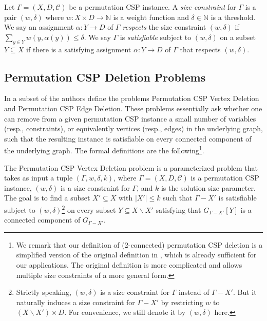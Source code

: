 \documentclass[a4paper,11pt]{article}
\numberwithin{lemma}{section}
\begin{document}
Let $\varGamma = (X,D,\mathcal{C})$ be a permutation CSP instance.
A \emph{size constraint} for $\varGamma$ is a pair $(w,\delta)$ where $w\colon X \times D \to \mathbb{N}$ is a weight function and $\delta \in \mathbb{N}$ is a threshold.
We say an assignment $\alpha\colon Y \to D$ of $\varGamma$ \emph{respects} the size constraint $(w,\delta)$ if $\sum_{y \in Y} w(y,\alpha(y)) \leq \delta$.
We say $\varGamma$ is \emph{satisfiable} subject to $(w,\delta)$ on a subset $Y \subseteq X$ if there is a satisfying assignment $\alpha\colon Y \to D$ of $\varGamma$ that respects $(w,\delta)$.

\subsection{Permutation CSP Deletion Problems}

In \cite{MarxMNT22} a subset of the authors define the problems {\sc Permutation CSP Vertex Deletion} and {\sc Permutation CSP Edge Deletion}.
These problems essentially ask whether one can remove from a given permutation CSP instance a small number of variables (resp., constraints), or equivalently vertices (resp., edges) in the underlying graph, such that the resulting instance is satisfiable on every connected component of the underlying graph.
The formal definitions are the following\footnote{We remark that our definition of (2-connected) permutation CSP deletion is a simplified version of the original definition in \cite{MarxMNT22}, which is already sufficient for our applications.
The original definition is more complicated and allows multiple size constraints of a more general form.}.

The {\sc Permutation CSP Vertex Deletion} problem is a parameterized problem that takes as input a tuple $(\varGamma,w,\delta,k)$, where $\varGamma = (X,D,\mathcal{C})$ is a permutation CSP instance, $(w,\delta)$ is a size constraint for $\varGamma$, and $k$ is the solution size parameter.
The goal is to find a subset $X' \subseteq X$ with $|X'| \leq k$ such that $\varGamma - X'$ is satisfiable subject to $(w,\delta)$\footnote{Strictly speaking, $(w,\delta)$ is a size constraint for $\varGamma$ instead of $\varGamma - X'$. But it naturally induces a size constraint for $\varGamma - X'$ by restricting $w$ to $(X \backslash X') \times D$. For convenience, we still denote it by $(w,\delta)$ here.} on every subset $Y \subseteq X \backslash X'$ satisfying that $G_{\varGamma - X'}[Y]$ is a connected component of $G_{\varGamma - X'}$.
\end{document}
